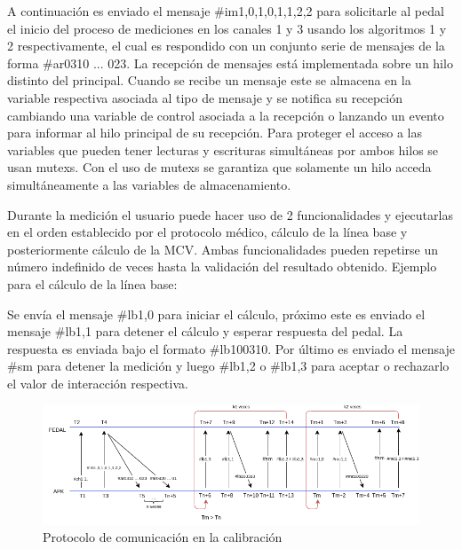 \vspace{10pt}
A continuación es enviado el mensaje \#im1,0,1,0,1,1,2,2 para solicitarle al pedal el inicio del proceso de mediciones en los canales 1 y 3 usando los algoritmos 1 y 2 respectivamente, el cual es respondido con un conjunto serie de mensajes de la forma \#ar0310 ... 023. La recepción de mensajes está implementada sobre un hilo distinto del principal. Cuando se recibe un mensaje este se almacena en la variable respectiva asociada al tipo de mensaje y se notifica su recepción cambiando una variable de control asociada a la recepción o lanzando un evento para informar al hilo principal de su recepción. Para proteger el acceso a las variables que pueden tener lecturas y escrituras simultáneas por ambos hilos se usan mutexs. Con el uso de mutexs se garantiza que solamente un hilo acceda simultáneamente a las variables de almacenamiento. 

\vspace{10pt}
Durante la medición el usuario puede hacer uso de 2 funcionalidades y ejecutarlas en el orden establecido por el protocolo médico, cálculo de la línea base y posteriormente cálculo de la MCV. Ambas funcionalidades pueden repetirse un número indefinido de veces hasta la validación del resultado obtenido. Ejemplo para el cálculo de la línea base:
    
\vspace{10pt}
Se envía el mensaje \#lb1,0 para iniciar el cálculo, próximo este es enviado el mensaje  \#lb1,1 para detener el cálculo y esperar respuesta del pedal. La respuesta es enviada bajo el formato  \#lb100310. Por último es enviado el mensaje \#sm para detener la medición y luego \#lb1,2 o \#lb1,3 para aceptar o rechazarlo el valor de interacción respectiva.  

    
\begin{figure}[ht]
    \centering
    \includegraphics[scale=0.58]{images/diagram-protocol-in-calibration.png}
    \caption{Protocolo de comunicación en la calibración}
    \label{fig: diagram-protocol-in-calibration}
\end{figure}
